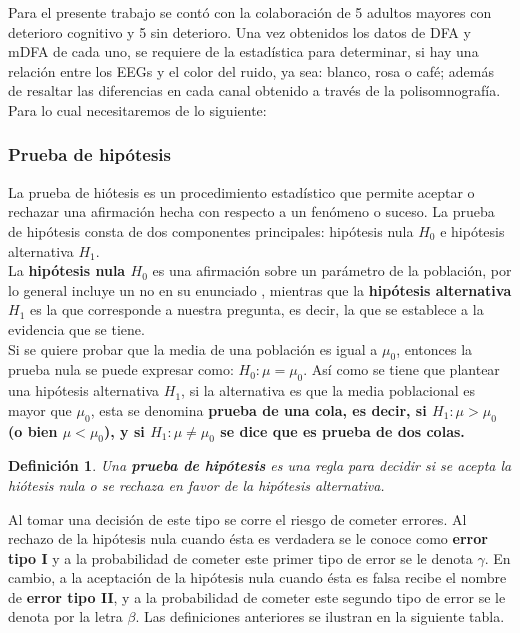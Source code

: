 \documentclass[letterpaper,titlepage,12pt,draft]{report}
\newtheorem{definition}{Definici\'on}
\begin{document}
Para el presente trabajo se cont\'o con la colaboraci\'on de 5 adultos mayores con deterioro cognitivo y 5 sin deterioro. Una vez obtenidos los datos de DFA y mDFA de cada uno, se requiere de la estad\'istica para determinar, si hay una relaci\'on entre los EEGs y el color del ruido, ya sea: blanco, rosa o caf\'e; adem\'as de resaltar las diferencias en cada canal obtenido a trav\'es de la polisomnograf\'ia. Para lo cual necesitaremos de lo siguiente:

\subsubsection{Prueba de hip\'otesis}

La prueba de hi\'otesis es un procedimiento estad\'istico que permite aceptar o rechazar una afirmaci\'on hecha con respecto a un fen\'omeno o suceso. La prueba de hip\'otesis consta de dos componentes principales: hip\'otesis nula $H_0$ e hip\'otesis alternativa $H_1$.\\

La \textbf{hip\'otesis nula $H_0$} es una afirmaci\'on sobre un par\'ametro de la poblaci\'on, por lo general incluye un no en su enunciado \cite{Estec}, mientras que la \textbf{hip\'otesis alternativa $H_1$} es la que corresponde a nuestra pregunta, es decir, la que se establece a la evidencia que se tiene.\\

Si se quiere probar que la media de una poblaci\'on es igual a $\mu_0$, entonces la prueba nula se puede expresar como: $H_0: \mu=\mu_0$. As\'i como se tiene que plantear una hip\'otesis alternativa $H_1$, si la alternativa es que la media poblacional es mayor que $\mu_0$, esta se denomina \bf{prueba de una cola}, es decir, si $H_1: \mu > \mu_0 $ (o bien $\mu < \mu_0$), y si $H_1: \mu \neq \mu_0$ se dice que es \bf{prueba de dos colas}. 

\begin{definition}
Una \textbf{prueba de hip\'otesis} es una regla para decidir si se acepta la hi\'otesis nula o se rechaza en favor de la hip\'otesis alternativa.
\end{definition}

Al tomar una decisi\'on de este tipo se corre el riesgo de cometer errores. Al rechazo de la hip\'otesis nula cuando \'esta es verdadera se le conoce como \textbf{error tipo I} y a la probabilidad de cometer este primer tipo de error se le denota $\gamma$. En cambio, a la aceptaci\'on de la hip\'otesis nula cuando \'esta es falsa recibe el nombre de \textbf{error tipo II}, y a la probabilidad de cometer este segundo tipo de error se le denota por la letra $\beta$. Las definiciones anteriores se ilustran en la siguiente tabla.\cite{Rincon}
\end{document}
